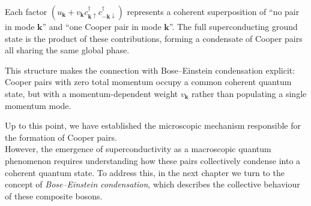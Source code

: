 Each factor \((u_{\mathbf{k}} + v_{\mathbf{k}} c_{\mathbf{k}\uparrow}^{\dagger}c_{-\mathbf{k}\downarrow}^{\dagger})\)  
represents a coherent superposition of “no pair in mode \(\mathbf{k}\)” and “one Cooper pair in mode \(\mathbf{k}\)”.  
The full superconducting ground state is the product of these contributions, forming a condensate of Cooper pairs all sharing the same global phase.

This structure makes the connection with Bose--Einstein condensation explicit:  
Cooper pairs with zero total momentum occupy a common coherent quantum state,  
but with a momentum-dependent weight \(v_{\mathbf{k}}\) rather than populating a single momentum mode.

\bigskip
Up to this point, we have established the microscopic mechanism responsible for the formation of Cooper pairs.\\  
However, the emergence of superconductivity as a macroscopic quantum phenomenon requires understanding how these pairs collectively condense into a coherent quantum state.  
To address this, in the next chapter we turn to the concept of \textit{Bose–Einstein condensation}, which describes the collective behaviour of these composite bosons.









